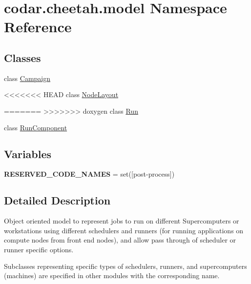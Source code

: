 \hypertarget{namespacecodar_1_1cheetah_1_1model}{}\section{codar.\+cheetah.\+model Namespace Reference}
\label{namespacecodar_1_1cheetah_1_1model}
\subsection*{Classes}
\begin{DoxyCompactItemize}
\item 
class \hyperlink{classcodar_1_1cheetah_1_1model_1_1_campaign}{Campaign}
\item 
<<<<<<< HEAD
class \hyperlink{classcodar_1_1cheetah_1_1model_1_1_node_layout}{Node\+Layout}
\item 
=======
>>>>>>> doxygen
class \hyperlink{classcodar_1_1cheetah_1_1model_1_1_run}{Run}
\item 
class \hyperlink{classcodar_1_1cheetah_1_1model_1_1_run_component}{Run\+Component}
\end{DoxyCompactItemize}
\subsection*{Variables}
\begin{DoxyCompactItemize}
\item 
\mbox{\label{namespacecodar_1_1cheetah_1_1model_a7d8bea761417a3809aef433e77fd2887}} 
{\bfseries R\+E\+S\+E\+R\+V\+E\+D\+\_\+\+C\+O\+D\+E\+\_\+\+N\+A\+M\+ES} = set(\mbox{[}\textquotesingle{}post-\/process\textquotesingle{}\mbox{]})
\end{DoxyCompactItemize}


\subsection{Detailed Description}
\begin{DoxyVerb}Object oriented model to represent jobs to run on different Supercomputers or
workstations using different schedulers and runners (for running applications
on compute nodes from front end nodes), and allow pass through of scheduler
or runner specific options.

Subclasses representing specific types of schedulers, runners, and
supercomputers (machines) are specified in other modules with the corresponding
name.
\end{DoxyVerb}
 